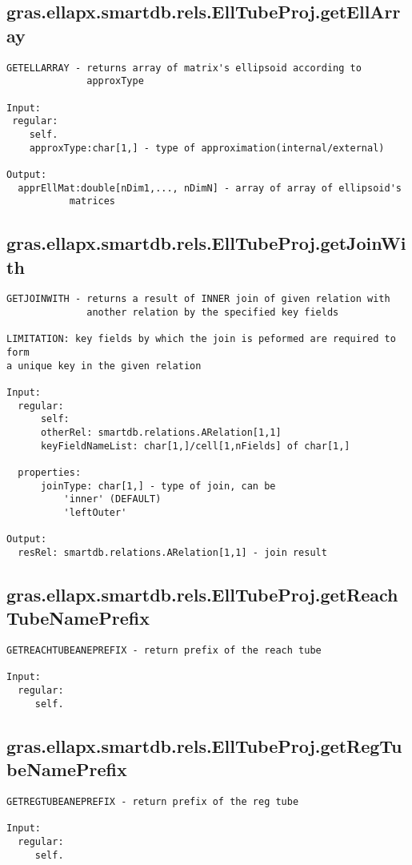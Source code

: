 \subsection{\texorpdfstring{gras.ellapx.smartdb.rels.EllTubeProj.getEllArray}{getEllArray}}\label{method:gras.ellapx.smartdb.rels.EllTubeProj.getEllArray}
\begin{verbatim}
GETELLARRAY - returns array of matrix's ellipsoid according to
              approxType

Input:
 regular:
    self.
    approxType:char[1,] - type of approximation(internal/external)

Output:
  apprEllMat:double[nDim1,..., nDimN] - array of array of ellipsoid's
           matrices
\end{verbatim}
\subsection{\texorpdfstring{gras.ellapx.smartdb.rels.EllTubeProj.getJoinWith}{getJoinWith}}\label{method:gras.ellapx.smartdb.rels.EllTubeProj.getJoinWith}
\begin{verbatim}
GETJOINWITH - returns a result of INNER join of given relation with
              another relation by the specified key fields

LIMITATION: key fields by which the join is peformed are required to form
a unique key in the given relation

Input:
  regular:
      self:
      otherRel: smartdb.relations.ARelation[1,1]
      keyFieldNameList: char[1,]/cell[1,nFields] of char[1,]

  properties:
      joinType: char[1,] - type of join, can be
          'inner' (DEFAULT)
          'leftOuter'

Output:
  resRel: smartdb.relations.ARelation[1,1] - join result
\end{verbatim}
\subsection{\texorpdfstring{gras.ellapx.smartdb.rels.EllTubeProj.getReachTubeNamePrefix}{getReachTubeNamePrefix}}\label{method:gras.ellapx.smartdb.rels.EllTubeProj.getReachTubeNamePrefix}
\begin{verbatim}
GETREACHTUBEANEPREFIX - return prefix of the reach tube

Input:
  regular:
     self.
\end{verbatim}
\subsection{\texorpdfstring{gras.ellapx.smartdb.rels.EllTubeProj.getRegTubeNamePrefix}{getRegTubeNamePrefix}}\label{method:gras.ellapx.smartdb.rels.EllTubeProj.getRegTubeNamePrefix}
\begin{verbatim}
GETREGTUBEANEPREFIX - return prefix of the reg tube

Input:
  regular:
     self.
\end{verbatim}
